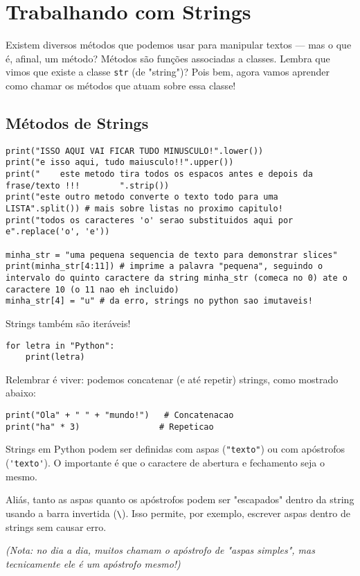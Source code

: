 \documentclass[12pt]{book}
\begin{document}
	\chapter{Trabalhando com Strings}
	
	Existem diversos métodos que podemos usar para manipular textos — mas o que é, afinal, um método?  
	Métodos são funções associadas a classes. Lembra que vimos que existe a classe \texttt{str} (de "string")? Pois bem, agora vamos aprender como chamar os métodos que atuam sobre essa classe!

	\section{Métodos de Strings}
	\begin{lstlisting}[caption={Métodos com string}]
print("ISSO AQUI VAI FICAR TUDO MINUSCULO!".lower())
print("e isso aqui, tudo maiusculo!!".upper())
print("    este metodo tira todos os espacos antes e depois da frase/texto !!!        ".strip())
print("este outro metodo converte o texto todo para uma LISTA".split()) # mais sobre listas no proximo capitulo!
print("todos os caracteres 'o' serao substituidos aqui por e".replace('o', 'e'))

minha_str = "uma pequena sequencia de texto para demonstrar slices"
print(minha_str[4:11]) # imprime a palavra "pequena", seguindo o intervalo do quinto caractere da string minha_str (comeca no 0) ate o caractere 10 (o 11 nao eh incluido)
minha_str[4] = "u" # da erro, strings no python sao imutaveis!\end{lstlisting}

	Strings também são iteráveis!

	\begin{lstlisting}[caption={Iterando sobre strings}]
for letra in "Python":
	print(letra)
\end{lstlisting}

	Relembrar é viver: podemos concatenar (e até repetir) strings, como mostrado abaixo:

	\begin{lstlisting}[caption={Concatenação e repetição de strings}]
print("Ola" + " " + "mundo!")   # Concatenacao
print("ha" * 3)                # Repeticao
\end{lstlisting}

	\begin{tcolorbox}[colback=gray!10, colframe=black, title={\large\bfseries Observação}]
		Strings em Python podem ser definidas com aspas (\verb|"texto"|) ou com apóstrofos (\verb|'texto'|). O importante é que o caractere de abertura e fechamento seja o mesmo.
		
		Aliás, tanto as aspas quanto os apóstrofos podem ser "escapados" dentro da string usando a barra invertida (\verb|\|). Isso permite, por exemplo, escrever aspas dentro de strings sem causar erro.
		
		\textit{(Nota: no dia a dia, muitos chamam o apóstrofo de "aspas simples", mas tecnicamente ele é um apóstrofo mesmo!)}
	\end{tcolorbox}
\end{document}
